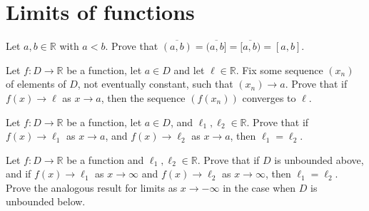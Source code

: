 \section{Limits of functions}



\begin{exercise}
Let $a,b \in \mathbb{R}$ with $a<b$. Prove that $\overline{(a,b)} = \overline{(a,b]} = \overline{[a,b)} = [a,b]$.
\end{exercise}


\begin{exercise}
Let $f : D \to \mathbb{R}$ be a function, let $a \in D$ and let $\ell \in \mathbb{R}$. Fix some sequence $(x_n)$ of elements of $D$, not eventually constant, such that $(x_n) \to a$. Prove that if $f(x) \to \ell$ as $x \to a$, then the sequence $(f(x_n))$ converges to $\ell$.
\end{exercise}


\begin{exercise}
\label{exLimitsOfFunctionsAreUnique}
Let $f : D \to \mathbb{R}$ be a function, let $a \in D$, and $\ell_1, \ell_2 \in \mathbb{R}$. Prove that if $f(x) \to \ell_1$ as $x \to a$, and $f(x) \to \ell_2$ as $x \to a$, then $\ell_1=\ell_2$.
\end{exercise}


\begin{exercise}
\label{exInfiniteLimitsOfFunctionsAreUnique}
Let $f : D \to \mathbb{R}$ be a function and $\ell_1, \ell_2 \in \mathbb{R}$. Prove that if $D$ is unbounded above, and if $f(x) \to \ell_1$ as $x \to \infty$ and $f(x) \to \ell_2$ as $x \to \infty$, then $\ell_1=\ell_2$. Prove the analogous result for limits as $x \to -\infty$ in the case when $D$ is unbounded below.
\end{exercise}









